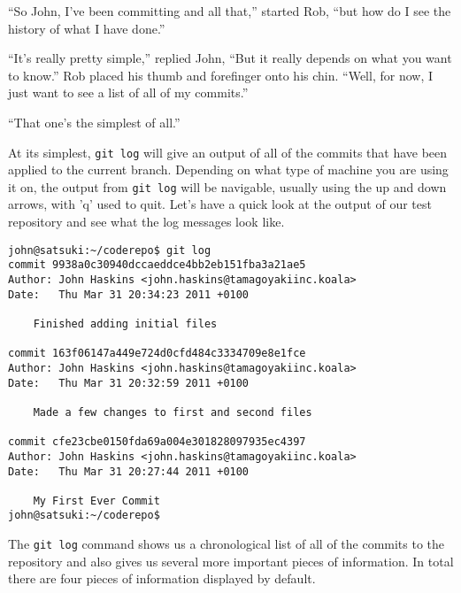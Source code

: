 \begin{trenches}
``So John, I've been committing and all that,'' started Rob, ``but how do I see the history of what I have done.''

``It's really pretty simple,'' replied John, ``But it really depends on what you want to know.''
Rob placed his thumb and forefinger onto his chin.  ``Well, for now, I just want to see a list of all of my commits.''

``That one's the simplest of all.''
\end{trenches}

At its simplest, \texttt{git log} will give an output of all of the commits that have been applied to the current branch.  Depending on what type of machine you are using it on, the output from \texttt{git log} will be navigable, usually using the up and down arrows, with 'q' used to quit.  Let's have a quick look at the output of our test repository and see what the log messages look like.

\begin{Verbatim}[frame=leftline,framerule=1mm,fontsize=\relsize{-3}] 
john@satsuki:~/coderepo$ git log
commit 9938a0c30940dccaeddce4bb2eb151fba3a21ae5
Author: John Haskins <john.haskins@tamagoyakiinc.koala>
Date:   Thu Mar 31 20:34:23 2011 +0100

    Finished adding initial files

commit 163f06147a449e724d0cfd484c3334709e8e1fce
Author: John Haskins <john.haskins@tamagoyakiinc.koala>
Date:   Thu Mar 31 20:32:59 2011 +0100

    Made a few changes to first and second files

commit cfe23cbe0150fda69a004e301828097935ec4397
Author: John Haskins <john.haskins@tamagoyakiinc.koala>
Date:   Thu Mar 31 20:27:44 2011 +0100

    My First Ever Commit
john@satsuki:~/coderepo$ 

\end{Verbatim}

The \texttt{git log} command shows us a chronological list of all of the commits to the repository and also gives us several more important pieces of information.  In total there are four pieces of information displayed by default.

